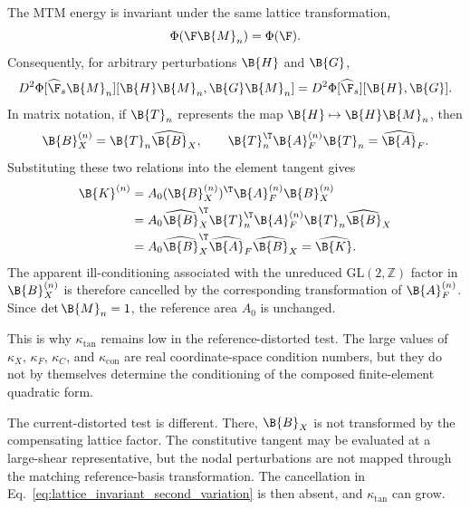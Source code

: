 The MTM energy is invariant under the same lattice transformation,
\begin{equation}
    \Phi(\F\B{M}_n) = \Phi(\F).
\end{equation}
Consequently, for arbitrary perturbations $\B{H}$ and $\B{G}$,
\begin{equation}
    D^2\Phi[\widehat{\F}_s\B{M}_n]
    [\B{H}\B{M}_n,\B{G}\B{M}_n]
    =
    D^2\Phi[\widehat{\F}_s][\B{H},\B{G}].
    \label{eq:lattice_invariant_second_variation}
\end{equation}
In matrix notation, if $\B{T}_n$ represents the map
$\B{H}\mapsto\B{H}\B{M}_n$, then
\begin{equation}
    \B{B}^{(n)}_X = \B{T}_n\widehat{\B{B}}_X,
    \qquad
    \B{T}_n^\T \B{A}^{(n)}_F \B{T}_n
    =
    \widehat{\B{A}}_F .
\end{equation}
Substituting these two relations into the element tangent gives
\begin{equation}
\begin{split}
    \B{K}^{(n)}
    &=
    A_0
    (\B{B}^{(n)}_X)^\T
    \B{A}^{(n)}_F
    \B{B}^{(n)}_X
    \\
    &=
    A_0
    \widehat{\B{B}}_X^\T
    \B{T}_n^\T
    \B{A}^{(n)}_F
    \B{T}_n
    \widehat{\B{B}}_X
    \\
    &=
    A_0
    \widehat{\B{B}}_X^\T
    \widehat{\B{A}}_F
    \widehat{\B{B}}_X
    =
    \widehat{\B{K}} .
\end{split}
\end{equation}
The apparent ill-conditioning associated with the unreduced
$\mathrm{GL}(2,\mathbb{Z})$ factor in $\B{B}^{(n)}_X$ is therefore cancelled
by the corresponding transformation of $\B{A}^{(n)}_F$. Since
$\det\B{M}_n=1$, the reference area $A_0$ is unchanged.

This is why $\kappa_{\mathrm{tan}}$ remains low in the reference-distorted
test. The large values of $\kappa_X$, $\kappa_F$, $\kappa_C$, and
$\kappa_{\mathrm{con}}$ are real coordinate-space condition numbers, but they
do not by themselves determine the conditioning of the composed
finite-element quadratic form.

The current-distorted test is different. There, $\B{B}_X$ is not transformed
by the compensating lattice factor. The constitutive tangent may be evaluated
at a large-shear representative, but the nodal perturbations are not mapped
through the matching reference-basis transformation. The cancellation in
Eq.~\eqref{eq:lattice_invariant_second_variation} is then absent, and
$\kappa_{\mathrm{tan}}$ can grow.

